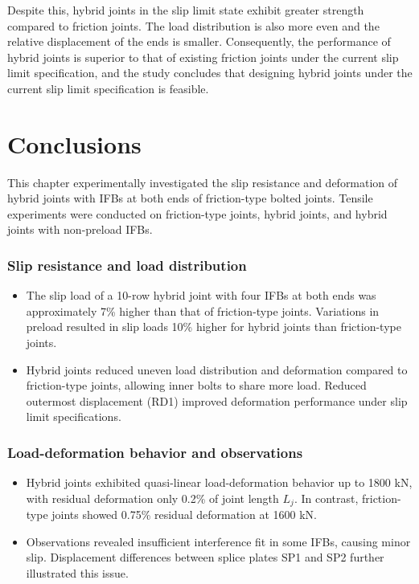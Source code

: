 Despite this, hybrid joints in the slip limit state exhibit greater strength compared to friction joints. The load distribution is also more even and the relative displacement of the ends is smaller. Consequently, the performance of hybrid joints is superior to that of existing friction joints under the current slip limit specification, and the study concludes that designing hybrid joints under the current slip limit specification is feasible.



\section{Conclusions}

This chapter experimentally investigated the slip resistance and deformation of hybrid joints with IFBs at both ends of friction-type bolted joints. Tensile  experiments  were conducted on friction-type joints, hybrid joints, and hybrid joints with non-preload IFBs.

\subsubsection*{Slip resistance and load distribution}
\begin{itemize}
    \item The slip load of a 10-row hybrid joint with four IFBs at both ends was approximately 7\% higher than that of friction-type joints. Variations in preload resulted in slip loads 10\% higher for hybrid joints than friction-type joints.
    \item Hybrid joints reduced uneven load distribution and deformation compared to friction-type joints, allowing inner bolts to share more load. Reduced outermost displacement (RD1) improved deformation performance under slip limit specifications.
\end{itemize}

\subsubsection*{Load-deformation behavior and observations}
\begin{itemize}
    \item Hybrid joints exhibited quasi-linear load-deformation behavior up to 1800 kN, with residual deformation only 0.2\% of joint length $L_j$. In contrast, friction-type joints showed 0.75\% residual deformation at 1600 kN.
    \item Observations revealed insufficient interference fit in some IFBs, causing minor slip. Displacement differences between splice plates SP1 and SP2 further illustrated this issue.
\end{itemize}

